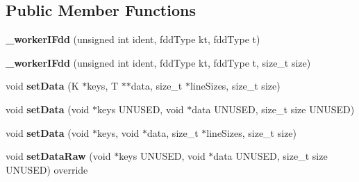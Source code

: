 \subsection*{Public Member Functions}
\begin{DoxyCompactItemize}
\item 
\hypertarget{classfaster_1_1__workerIFdd_3_01K_00_01T_01_5_01_4_a9f0be9976988a83b3339d8387ff8e2e1}{}{\bfseries \+\_\+worker\+I\+Fdd} (unsigned int ident, fdd\+Type kt, fdd\+Type t)\label{classfaster_1_1__workerIFdd_3_01K_00_01T_01_5_01_4_a9f0be9976988a83b3339d8387ff8e2e1}

\item 
\hypertarget{classfaster_1_1__workerIFdd_3_01K_00_01T_01_5_01_4_a98d1388d2afd0339d5c04a985e6eb8d1}{}{\bfseries \+\_\+worker\+I\+Fdd} (unsigned int ident, fdd\+Type kt, fdd\+Type t, size\+\_\+t size)\label{classfaster_1_1__workerIFdd_3_01K_00_01T_01_5_01_4_a98d1388d2afd0339d5c04a985e6eb8d1}

\item 
\hypertarget{classfaster_1_1__workerIFdd_3_01K_00_01T_01_5_01_4_ab87f4b8c53a15b94190cbcbba67e8c8b}{}void {\bfseries set\+Data} (K $\ast$keys, T $\ast$$\ast$data, size\+\_\+t $\ast$line\+Sizes, size\+\_\+t size)\label{classfaster_1_1__workerIFdd_3_01K_00_01T_01_5_01_4_ab87f4b8c53a15b94190cbcbba67e8c8b}

\item 
\hypertarget{classfaster_1_1__workerIFdd_3_01K_00_01T_01_5_01_4_a08aa87e7f72eec843f350725d62b76ee}{}void {\bfseries set\+Data} (void $\ast$keys U\+N\+U\+S\+E\+D, void $\ast$data U\+N\+U\+S\+E\+D, size\+\_\+t size U\+N\+U\+S\+E\+D)\label{classfaster_1_1__workerIFdd_3_01K_00_01T_01_5_01_4_a08aa87e7f72eec843f350725d62b76ee}

\item 
\hypertarget{classfaster_1_1__workerIFdd_3_01K_00_01T_01_5_01_4_a2a73efd212717ed23a1e406635d80f5d}{}void {\bfseries set\+Data} (void $\ast$keys, void $\ast$data, size\+\_\+t $\ast$line\+Sizes, size\+\_\+t size)\label{classfaster_1_1__workerIFdd_3_01K_00_01T_01_5_01_4_a2a73efd212717ed23a1e406635d80f5d}

\item 
\hypertarget{classfaster_1_1__workerIFdd_3_01K_00_01T_01_5_01_4_ab46600ab2aa1630da2edf94fa0501182}{}void {\bfseries set\+Data\+Raw} (void $\ast$keys U\+N\+U\+S\+E\+D, void $\ast$data U\+N\+U\+S\+E\+D, size\+\_\+t size U\+N\+U\+S\+E\+D) override\label{classfaster_1_1__workerIFdd_3_01K_00_01T_01_5_01_4_ab46600ab2aa1630da2edf94fa0501182}


\end{DoxyCompactItemize}
